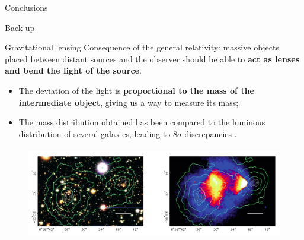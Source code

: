 \documentclass[8pt]{beamer}
\newcommand{\backupbegin}{
   \newcounter{finalframe}
   \setcounter{finalframe}{\value{framenumber}}
}
\begin{document}
\begin{frame}{Conclusions}
\justifying

\end{frame}

\appendix
\backupbegin

\begin{frame}[standout]
Back up
\end{frame}

\begin{frame}{Gravitational lensing}
\justifying
\vspace{5pt}
Consequence of the general relativity: massive objects placed between distant sources and the observer should be able to \textbf{act as lenses and bend the light of the source}. \vfill

\begin{itemize}
\justifying
\item The deviation of the light is \textbf{proportional to the mass of the intermediate object}, giving us a way to measure its mass;
\item The mass distribution obtained has been compared to the luminous distribution of several galaxies, \alert{leading to $8\sigma$ discrepancies} \cite{BulletClusterSigma}.
\end{itemize} \vfill

\vspace{-5pt}
\begin{figure}[htbp]
\begin{center}
\includegraphics[width=11	cm, height=4cm]{figs/BulletCluster.png}
\end{center}
\end{figure} \vfill
\end{frame}
\end{document}
